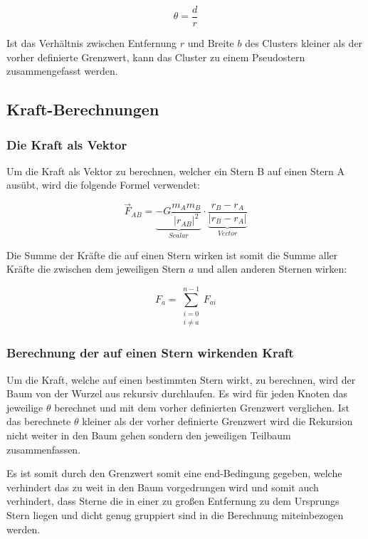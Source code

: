 \begin{equation}
    \label{eq:barnes_hut} \theta = \frac{d}{r}
\end{equation}

Ist das Verhältnis zwischen Entfernung \( r \) und Breite \( b \) des Clusters
kleiner als der vorher definierte Grenzwert, kann das Cluster zu einem
Pseudostern zusammengefasst werden.  

\subsection{Kraft-Berechnungen}


\subsubsection{Die Kraft als Vektor}
Um die Kraft als Vektor zu berechnen, welcher ein Stern B auf einen Stern A
ausübt, wird die folgende Formel verwendet:

\begin{equation}
    \vec{F}_{AB} = \underbrace{-G \frac{m_A m_B}{|r_{AB}|^2}}_{Scalar}
    \cdot \underbrace{\frac{r_B - r_A}{|r_B - r_A|}}_{Vector}
\end{equation}

Die Summe der Kräfte die auf einen Stern wirken ist somit die Summe aller
Kräfte die zwischen dem jeweiligen Stern \( a \) und allen anderen Sternen
wirken:

\begin{equation}
    F_{a} = \sum_{\substack{i=0 \\ i\neq a}}^{n-1} F_{ai}
\end{equation}

\subsubsection{Berechnung der auf einen Stern wirkenden Kraft}

\par Um die Kraft, welche auf einen bestimmten Stern wirkt, zu berechnen, wird der
Baum von der Wurzel aus rekursiv durchlaufen. Es wird für jeden Knoten das
jeweilige \( \theta \) berechnet und mit dem vorher definierten Grenzwert
verglichen. Ist das berechnete \( \theta \) kleiner als der vorher definierte
Grenzwert wird die Rekursion nicht weiter in den Baum gehen sondern den
jeweiligen Teilbaum zusammenfassen.

\par Es ist somit durch den Grenzwert somit eine end-Bedingung gegeben, welche
verhindert das zu weit in den Baum vorgedrungen wird und somit auch verhindert,
dass Sterne die in einer zu großen Entfernung zu dem Ursprungs Stern liegen und
dicht genug gruppiert sind in die Berechnung miteinbezogen werden.

